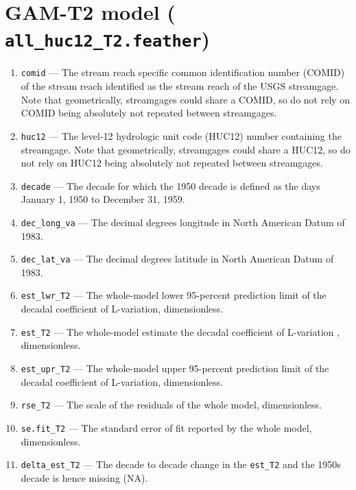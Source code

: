 \documentclass[1p, authoryear, 11pt, times, preprint]{elsarticle}
\newcommand{\code}[1]{{\color{black}%
                       \mbox{\lstinline[basicstyle={\small\ttfamily},
                                        keywordstyle=\scriptsize\ttfamily]|#1|}}}
\begin{document}

\section{GAM-T2 model (\code{all_huc12_T2.feather})}
\begin{enumerate}
\footnotesize
\RaggedRight
\item \code{comid} --- The stream reach specific common identification number (COMID) of the stream reach identified as the stream reach of the USGS streamgage. Note that geometrically, streamgages could share a COMID, so do not rely on COMID being absolutely not repeated between streamgages.
\item \code{huc12} --- The level-12 hydrologic unit code (HUC12) number containing the streamgage. Note that geometrically, streamgages could share a HUC12, so do not rely on HUC12 being absolutely not repeated between streamgages.
\item \code{decade} --- The decade for which the 1950 decade is defined as the days January 1, 1950 to December 31, 1959.
\item \code{dec_long_va} --- The decimal degrees longitude in North American Datum of 1983.
\item \code{dec_lat_va} --- The decimal degrees latitude in North American Datum of 1983.
\item \code{est_lwr_T2} --- The whole-model lower 95-percent prediction limit of the decadal coefficient of L-variation, dimensionless.
\item \code{est_T2} --- The whole-model estimate the decadal coefficient of L-variation , dimensionless.
\item \code{est_upr_T2} --- The whole-model upper 95-percent prediction limit of the decadal coefficient of L-variation, dimensionless.
\item \code{rse_T2} --- The scale of the residuals of the whole model, dimensionless.
\item \code{se.fit_T2} --- The standard error of fit reported by the whole model, dimensionless.
\item \code{delta_est_T2} --- The decade to decade change in the \code{est_T2} and the 1950s decade is hence missing (NA).
\end{enumerate}

 
\end{document}
